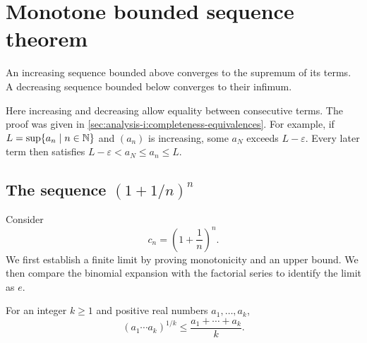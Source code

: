 \section{Monotone bounded sequence theorem}
\label{sec:analysis-i:monotone-bounded-sequence-theorem}

\begin{theorem}
  \label{thm:analysis-i:monotone-convergence}
  An increasing sequence bounded above converges to the supremum of
  its terms. A decreasing sequence bounded below converges to their infimum.
\end{theorem}

Here increasing and decreasing allow equality between consecutive terms.
The proof was given in \autoref{sec:analysis-i:completeness-equivalences}.
For example, if $L=\sup\{a_n\mid n\in\mathbb{N}\}$ and $(a_n)$ is increasing,
some $a_N$ exceeds $L-\varepsilon$. Every later term then satisfies
$L-\varepsilon<a_N\le a_n\le L$.

\subsection{The sequence \texorpdfstring{$(1+1/n)^n$}{(1+1/n) to the power n}}

Consider
\[
  c_n=\left(1+\frac1n\right)^n.
\]
We first establish a finite limit by proving monotonicity and an upper
bound. We then compare the binomial expansion with the factorial series
to identify the limit as $e$.

\begin{proposition}
  \label{thm:analysis-i:am-gm}
  For an integer $k\ge1$ and positive real numbers $a_1,\ldots,a_k$,
  \[
    (a_1\cdots a_k)^{1/k}\le\frac{a_1+\cdots+a_k}{k}.
  \]
\end{proposition}


